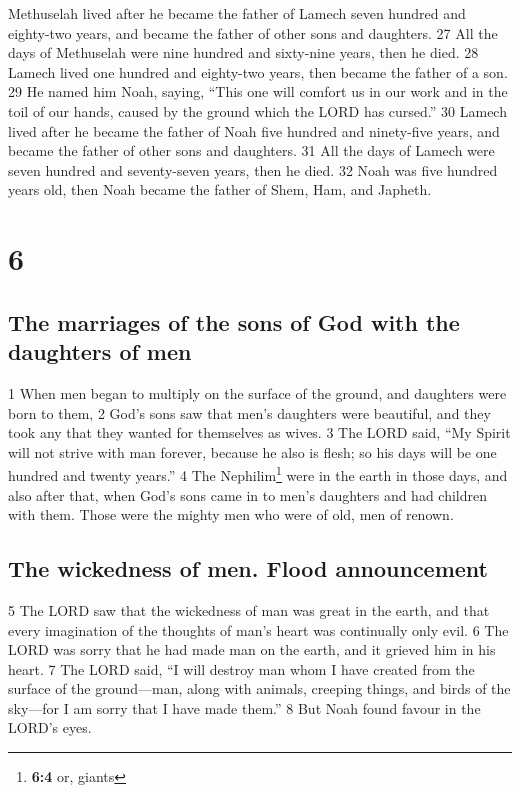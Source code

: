 Methuselah lived after he became the father of Lamech seven hundred and
eighty-two years, and became the father of other sons and daughters.
{27} All the days of Methuselah were nine hundred and sixty-nine years,
then he died. {28} Lamech lived one hundred and eighty-two years, then
became the father of a son. {29} He named him Noah, saying, ``This one
will comfort us in our work and in the toil of our hands, caused by the
ground which the LORD has cursed.'' {30} Lamech lived after he became
the father of Noah five hundred and ninety-five years, and became the
father of other sons and daughters. {31} All the days of Lamech were
seven hundred and seventy-seven years, then he died. {32} Noah was five
hundred years old, then Noah became the father of Shem, Ham, and
Japheth.

\hypertarget{section-5}{%
\section{6}\label{section-5}}

\hypertarget{the-marriages-of-the-sons-of-god-with-the-daughters-of-men}{%
\subsection{The marriages of the sons of God with the daughters of
men}\label{the-marriages-of-the-sons-of-god-with-the-daughters-of-men}}

{1} When men began to multiply on the surface of the ground, and
daughters were born to them, {2} God's sons saw that men's daughters
were beautiful, and they took any that they wanted for themselves as
wives. {3} The LORD said, ``My Spirit will not strive with man forever,
because he also is flesh; so his days will be one hundred and twenty
years.'' {4} The Nephilim\footnote{\textbf{6:4} or, giants} were in the
earth in those days, and also after that, when God's sons came in to
men's daughters and had children with them. Those were the mighty men
who were of old, men of renown.

\hypertarget{the-wickedness-of-men.-flood-announcement}{%
\subsection{The wickedness of men. Flood
announcement}\label{the-wickedness-of-men.-flood-announcement}}

{5} The LORD saw that the wickedness of man was great in the earth, and
that every imagination of the thoughts of man's heart was continually
only evil. {6} The LORD was sorry that he had made man on the earth, and
it grieved him in his heart. {7} The LORD said, ``I will destroy man
whom I have created from the surface of the ground---man, along with
animals, creeping things, and birds of the sky---for I am sorry that I
have made them.'' {8} But Noah found favour in the LORD's eyes.

